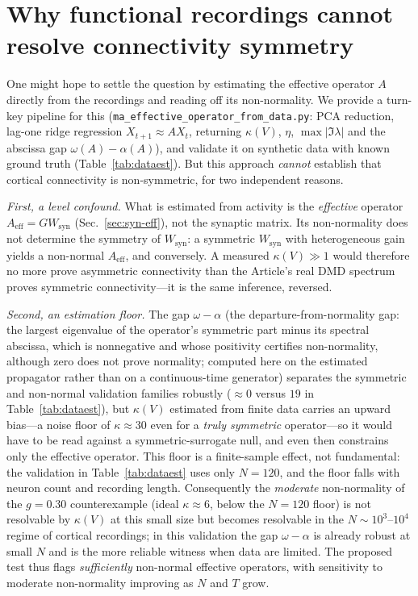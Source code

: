 \documentclass[11pt]{article}
\begin{document}
\section{Why functional recordings cannot resolve connectivity symmetry}
\label{sec:dataest}
One might hope to settle the question by estimating the effective operator $A$
directly from the recordings and reading off its non-normality. We provide a
turn-key pipeline for this
(\texttt{ma\_effective\_operator\_\allowbreak from\_data.py}: PCA
reduction, lag-one ridge regression $X_{t+1}\!\approx\!AX_t$, returning
$\kappa(V)$, $\eta$, $\max|\Im\lambda|$ and the abscissa gap
$\omega(A)-\alpha(A)$), and validate it on synthetic data with known ground truth
(Table~\ref{tab:dataest}). But this approach \emph{cannot} establish that cortical
connectivity is non-symmetric, for two independent reasons.

\emph{First, a level confound.} What is estimated from activity is the
\emph{effective} operator $A_{\mathrm{eff}}=GW_{\mathrm{syn}}$
(Sec.~\ref{sec:syn-eff}), not the synaptic matrix. Its non-normality does not
determine the symmetry of $W_{\mathrm{syn}}$: a symmetric $W_{\mathrm{syn}}$ with
heterogeneous gain yields a non-normal $A_{\mathrm{eff}}$, and conversely. A
measured $\kappa(V)\gg1$ would therefore no more prove asymmetric connectivity
than the Article's real DMD spectrum proves symmetric connectivity---it is the
same inference, reversed.

\emph{Second, an estimation floor.} The gap $\omega-\alpha$ (the
departure-from-normality gap: the largest eigenvalue of the operator's symmetric
part minus its spectral abscissa, which is nonnegative and whose positivity
certifies non-normality, although zero does not prove normality; computed here
on the estimated propagator rather than on a continuous-time generator)
separates the symmetric and non-normal validation families robustly
($\approx0$ versus $19$ in
Table~\ref{tab:dataest}), but $\kappa(V)$ estimated from finite data carries an
upward bias---a noise floor of $\kappa\!\approx\!30$ even for a \emph{truly
symmetric} operator---so it would have to be read against a symmetric-surrogate
null, and even then constrains only the effective operator. This floor is a
finite-sample effect, not fundamental: the validation in
Table~\ref{tab:dataest} uses only $N=120$, and the floor falls with neuron count
and recording length. Consequently the \emph{moderate} non-normality of the
$g{=}0.30$ counterexample (ideal $\kappa\approx6$, below the $N{=}120$ floor) is
not resolvable by $\kappa(V)$ at this small size but becomes resolvable in the
$N\sim10^3$--$10^4$ regime of cortical recordings; in this validation the gap
$\omega-\alpha$ is already robust at small $N$ and is the more reliable witness
when data are limited. The
proposed test thus flags \emph{sufficiently} non-normal effective operators,
with sensitivity to moderate non-normality improving as $N$ and $T$ grow.
\end{document}
